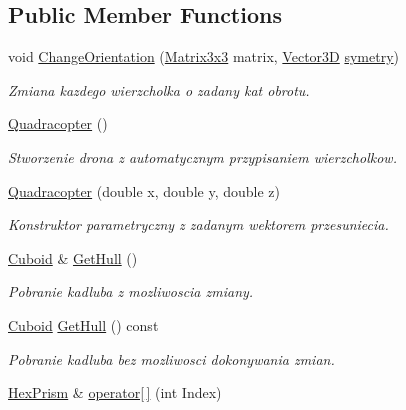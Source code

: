 \subsection*{Public Member Functions}
\begin{DoxyCompactItemize}
\item 
void \hyperlink{class_quadracopter_ac9bed2c9c204a7f260fec4f1f71e3402}{Change\+Orientation} (\hyperlink{matrix3x3_8hh_ae0d6db325717593a1d1157ecfa156f13}{Matrix3x3} matrix, \hyperlink{vector3_d_8hh_a8790ef07836c1639da216f46501979c0}{Vector3D} \hyperlink{class_object_of_scene_a3940aba3014aefed326cdc4301333af1}{symetry})
\begin{DoxyCompactList}\small\item\em Zmiana kazdego wierzcholka o zadany kat obrotu. \end{DoxyCompactList}\item 
\hyperlink{class_quadracopter_a9acb965be075b277df0901e99cccfacf}{Quadracopter} ()
\begin{DoxyCompactList}\small\item\em Stworzenie drona z automatycznym przypisaniem wierzcholkow. \end{DoxyCompactList}\item 
\hyperlink{class_quadracopter_a53ea4afb198dee646fa391296b00da48}{Quadracopter} (double x, double y, double z)
\begin{DoxyCompactList}\small\item\em Konstruktor parametryczny z zadanym wektorem przesuniecia. \end{DoxyCompactList}\item 
\hyperlink{class_cuboid}{Cuboid} \& \hyperlink{class_quadracopter_a1e565e85a55c6c2c1ea7db8869dd6dcc}{Get\+Hull} ()
\begin{DoxyCompactList}\small\item\em Pobranie kadluba z mozliwoscia zmiany. \end{DoxyCompactList}\item 
\hyperlink{class_cuboid}{Cuboid} \hyperlink{class_quadracopter_a331af4fd71ff51021a1787d8a4bef657}{Get\+Hull} () const 
\begin{DoxyCompactList}\small\item\em Pobranie kadluba bez mozliwosci dokonywania zmian. \end{DoxyCompactList}\item 
\hyperlink{class_hex_prism}{Hex\+Prism} \& \hyperlink{class_quadracopter_a48018a30c1ea5706c41dffee4214cd2a}{operator\mbox{[}$\,$\mbox{]}} (int Index)
\begin{DoxyCompactList}\small\item\em 

\end{DoxyCompactList}
\end{DoxyCompactItemize}
